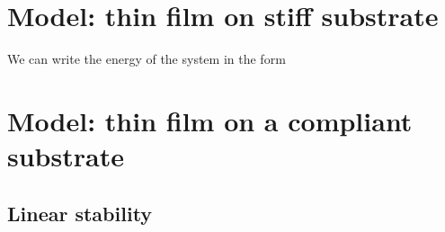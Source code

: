 \section{Model: thin film on stiff substrate}
\label{sec:rigid}
 We can write the energy of the system in the  form




\section{Model: thin film  on {a compliant} substrate }


\subsection{Linear stability}
